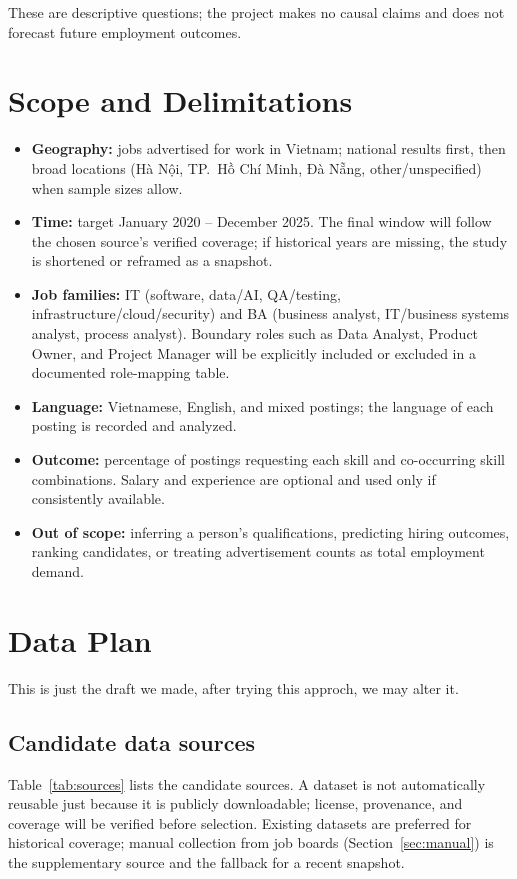 \documentclass[12pt,a4paper]{article}
\begin{document}
These are descriptive questions; the project makes no causal claims and does
not forecast future employment outcomes.

\section{Scope and Delimitations}

\begin{itemize}
  \item \textbf{Geography:} jobs advertised for work in Vietnam; national
        results first, then broad locations (Hà Nội, TP.~Hồ Chí Minh,
        Đà Nẵng, other/unspecified) when sample sizes allow.
  \item \textbf{Time:} target January 2020 -- December 2025. The final window
        will follow the chosen source's verified coverage; if historical
        years are missing, the study is shortened or reframed as a snapshot.
  \item \textbf{Job families:} IT (software, data/AI, QA/testing,
        infrastructure/cloud/security) and BA (business analyst, IT/business
        systems analyst, process analyst). Boundary roles such as Data
        Analyst, Product Owner, and Project Manager will be explicitly
        included or excluded in a documented role-mapping table.
  \item \textbf{Language:} Vietnamese, English, and mixed postings; the
        language of each posting is recorded and analyzed.
  \item \textbf{Outcome:} percentage of postings requesting each skill and
        co-occurring skill combinations. Salary and experience are optional
        and used only if consistently available.
  \item \textbf{Out of scope:} inferring a person's qualifications,
        predicting hiring outcomes, ranking candidates, or treating
        advertisement counts as total employment demand.
\end{itemize}

\section{Data Plan}\label{sec:data}
This is just the draft we made, after trying this approch, we may alter it.
\subsection{Candidate data sources}
Table~\ref{tab:sources} lists the candidate sources. A dataset is not
automatically reusable just because it is publicly downloadable; license,
provenance, and coverage will be verified before selection. Existing
datasets are preferred for historical coverage; manual collection from job
boards (Section~\ref{sec:manual}) is the supplementary source and the
fallback for a recent snapshot.
\end{document}
